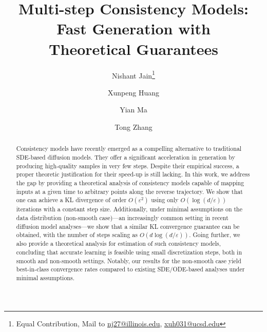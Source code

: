 \documentclass[11pt]{article}
\title{Multi-step Consistency Models: Fast Generation with  \\ Theoretical Guarantees}
\author[$\dagger$]{\normalsize Nishant Jain\thanks{Equal Contribution, Mail to \href{nj27@illinois.edu}{nj27@illinois.edu}, \href{xhuangck@connect.ust.hk}{xuh031@ucsd.edu} }}
\author[$\S$]{Xunpeng Huang\samethanks}
\author[$\S$]{Yian Ma}
\author[$\dagger$]{Tong Zhang}
\affil[$\dagger$]{University of Illinois Urbana-Champaign}
\affil[$\S$]{University of California San Diego}
\begin{document}
\date{}
\maketitle


\begin{abstract}
 Consistency models have recently emerged as a compelling alternative to traditional SDE-based diffusion models. They offer a significant acceleration in generation by producing high-quality samples in very few steps. Despite their empirical success, a proper theoretic justification for their speed-up is still lacking. 
 In this work, we address the gap by providing a theoretical analysis of consistency models capable of mapping inputs at a given time to arbitrary points along the reverse trajectory. We show that one can achieve a KL divergence of order \( O(\varepsilon^2) \) using only \( O\left(\log\left(d/\varepsilon\right)\right) \) iterations with a constant step size. 
 Additionally, under minimal assumptions on the data distribution (non-smooth case)—an increasingly common setting in recent diffusion model analyses—we show that a similar KL convergence guarantee can be obtained, with the number of steps scaling as \( O\left(d \log\left(d/\varepsilon\right)\right) \). 
 Going further, we also provide a theoretical analysis for estimation of such consistency models, concluding that accurate learning is feasible using small discretization steps, both in smooth and non-smooth settings. Notably, our results for the non-smooth case yield best-in-class convergence rates compared to existing SDE/ODE-based analyses under minimal assumptions.

\end{abstract}
\end{document}
